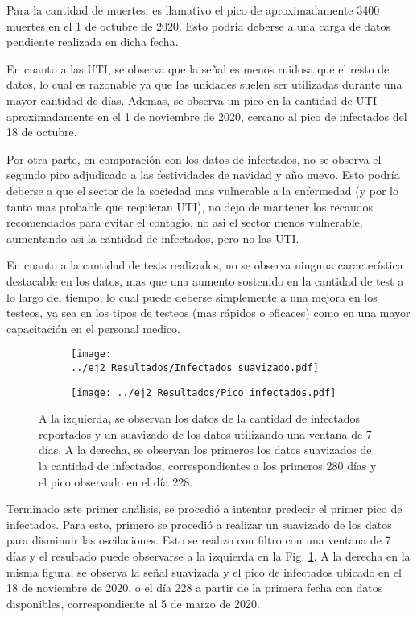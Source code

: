 Para la cantidad de muertes, es llamativo el pico de aproximadamente 3400 muertes en el 1 de octubre de 2020. Esto podría deberse a una carga de datos pendiente realizada en dicha fecha. 

En cuanto a las UTI, se observa que la señal es menos ruidosa que el resto de datos, lo cual es razonable ya que las unidades suelen ser utilizadas durante una mayor cantidad de días. Ademas, se observa un pico en la cantidad de UTI aproximadamente en el 1 de noviembre de 2020, cercano al pico de infectados del 18 de octubre.

Por otra parte, en comparación con los datos de infectados, no se observa el segundo pico adjudicado a las festividades de navidad y año nuevo. Esto podría deberse a que el sector de la sociedad mas vulnerable a la enfermedad (y por lo tanto mas probable que requieran UTI), no dejo de mantener los recaudos recomendados para evitar el contagio, no asi el sector menos vulnerable, aumentando asi la cantidad de infectados, pero no las UTI.

En cuanto a la cantidad de tests realizados, no se observa ninguna característica destacable en los datos, mas que una aumento sostenido en la cantidad de test a lo largo del tiempo, lo cual puede deberse simplemente a una mejora en los testeos, ya sea en los tipos de testeos (mas rápidos o eficaces) como en una mayor capacitación en el personal medico.


\begin{figure}[htb!]
    \begin{subfigure}[b]{0.48\textwidth}
        \texttt{[image: ../ej2\_Resultados/Infectados\_suavizado.pdf]}
    \end{subfigure}
    \hfill
    \begin{subfigure}[b]{0.48\textwidth}
        \texttt{[image: ../ej2\_Resultados/Pico\_infectados.pdf]}
    \end{subfigure}
    \caption{A la izquierda, se observan los datos de la cantidad de infectados reportados y un suavizado de los datos utilizando una ventana de 7 días. A la derecha, se observan los primeros los datos suavizados de la cantidad de infectados, correspondientes a los primeros 280 días y el pico observado en el día 228.}
    \label{ej2:Infectados_suavizado}
\end{figure}

Terminado este primer análisis, se procedió a intentar predecir el primer pico de infectados. Para esto, primero se procedió a realizar un suavizado de los datos para disminuir las oscilaciones. Esto se realizo con filtro con una ventana de 7 días y el resultado puede observarse a la izquierda en la Fig. \ref{ej2:Infectados_suavizado}. A la derecha en la misma figura, se observa la señal suavizada y el pico de infectados ubicado en el 18 de noviembre de 2020, o el día 228 a partir de la primera fecha con datos disponibles, correspondiente al 5 de marzo de 2020.

